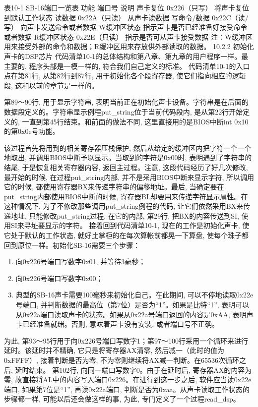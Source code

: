 \documentclass[12pt]{article}
\begin{document}
\begin{CJK}{UTF8}{gbsn}
表10-1 SB-16端口一览表
功能	端口号	说明
声卡复位	0x226（只写）	将声卡复位到默认工作状态
读数据	0x22A（只读）	从声卡读数据
写命令/数据	0x22C（读/写）	向声卡发送命令或者数据
W缓冲区状态		指示声卡是否已经准备好接受命令或者数据
R缓冲区状态	0x22E（只读）	指示是否可从声卡接受数据
注：W缓冲区用来接受外部的命令和数据；R缓冲区用来存放供外部读取的数据。
10.2.2  初始化声卡的DSP芯片
代码清单10-1的总体结构和第八章、第九章的用户程序一样。最主要的, 程序头部是一模一样的, 符合我们自己定义的标准。
代码清单10-1的入口点在第81行, 从第82行到87行, 用于初始化各个段寄存器, 使它们指向相应的逻辑段, 这和以前的章节是一样的。

第89～90行, 用于显示字符串, 表明当前正在初始化声卡设备。字符串是在后面的数据段定义的。字符串显示例程put\_{}string位于当前代码段内, 是从第22行开始定义的, 一直到第45行结束。和前面的做法不同, 这里直接用的是BIOS中断int 0x10的第0x0e号功能。

该过程首先将用到的相关寄存器压栈保护, 然后从给定的缓冲区内把字符一个一个地取出, 并调用BIOS中断予以显示。当取到的字符是0x00时, 表明遇到了字符串的结尾, 于是恢复相关寄存器内容, 返回主过程。注意, 这段代码经历了好几次修改, 最开始的时候, 在过程put\_{}string内部, 并不是采用BIOS中断来显示字符, 所以调用它的时候, 都使用寄存器BX来传递字符串的偏移地址。最后, 当确定要在put\_{}string内部使用BIOS中断的时候, 寄存器BL却要用来传递字符显示属性。在这种情况下, 为了不修改那些调用put\_{}string例程的代码, 让它们依然采用BX来传递地址, 只能修改put\_{}string过程, 在它的内部, 第29行, 把BX的内容传送到SI, 使用SI来寻址要显示的字符。
接着回到代码清单10-1, 现在的工作是初始化声卡, 使它处于默认的工作状态, 就好比掌柜的在每次算帐前都晃一下算盘, 使每个珠子都回到原位一样。初始化SB-16需要三个步骤：
\begin{enumerate}
\item 向0x226号端口写数字0x01, 并等待3毫秒；
\item 向0x226号端口写数字0x00；
\item 典型的SB-16声卡需要100毫秒来初始化自己。在此期间, 可以不停地读取0x22e号端口, 并判断数据的最高位（第7位）是否为“1”。如果是比特“1”, 表明可以从0x22a端口读取声卡的状态。如果从0x22a号端口返回的内容是0xAA, 表明声卡已经准备就绪。否则, 意味着声卡没有安装, 或者端口号不正确。
\end{enumerate}
为此, 第93～95行用于向0x226号端口写数字1；第97～100行采用一个循环来进行延时。该延时并不精确, 它只是将寄存器AX清零, 然后减一（此时的值为0xFFFF）, 接着判断是否为零, 不为零则继续将AX减一判断。在65536次循环之后, 延时结束。
第102行, 向同一端口写数字0。由于在延时后, 寄存器AX的内容为零, 故直接将AL中的内容写入端口0x226。在进行到这一步之后, 软件应当读0x22e端口, 如果第7位是“1”, 再读0x22a端口, 判断是否为0xaa。从声卡读取工作状态的步骤都一样, 可能以后还会做这样的事, 为此, 专门定义了一个过程read\_{}dsp。


\end{CJK}
\end{document}
